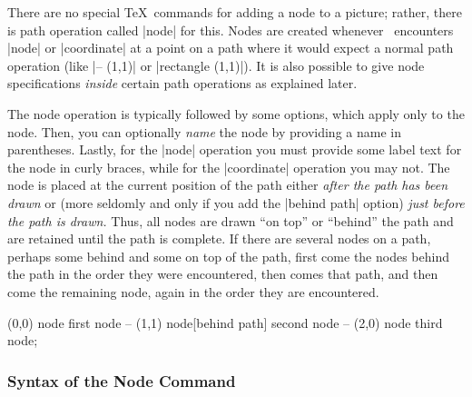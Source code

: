 There are no special \TeX\ commands for adding a node to a picture; rather,
there is path operation called |node| for this. Nodes are created whenever
\tikzname\ encounters |node| or |coordinate| at a point on a path where it
would expect a normal path operation (like |-- (1,1)| or |rectangle (1,1)|). It
is also possible to give node specifications \emph{inside} certain path
operations as explained later.

The node operation is typically followed by some options, which apply only to
the node. Then, you can optionally \emph{name} the node by providing a name in
parentheses. Lastly, for the |node| operation you must provide some label text
for the node in curly braces, while for the |coordinate| operation you may not.
The node is placed at the current position of the path either \emph{after the
path has been drawn} or (more seldomly and only if you add the |behind path|
option) \emph{just before the path is drawn.} Thus, all nodes are drawn ``on
top'' or ``behind'' the path and are retained until the path is complete. If
there are several nodes on a path, perhaps some behind and some on top of the
path, first come the nodes behind the path in the order they were encountered,
then comes that path, and then come the remaining node, again in the order they
are encountered.
%
\begin{codeexample}[]
\tikz \fill [fill=yellow!80!black]
     (0,0) node              {first node}
  -- (1,1) node[behind path] {second node}
  -- (2,0) node              {third node};
\end{codeexample}


\subsubsection{Syntax of the Node Command}

